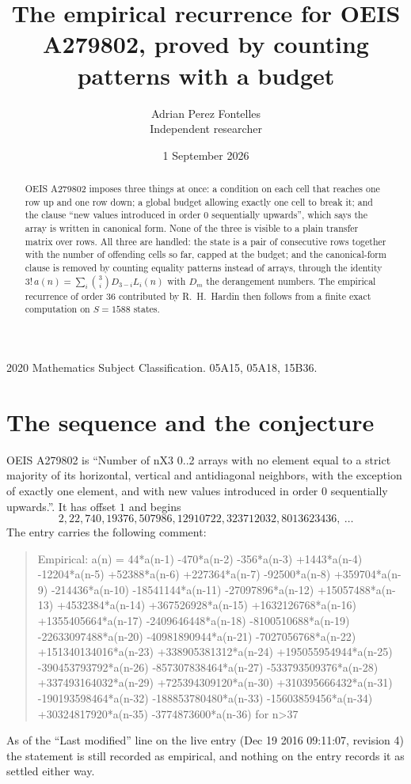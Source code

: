 \documentclass[11pt,a4paper]{article}
\title{The empirical recurrence for OEIS A279802, proved by counting patterns with a budget}
\author{Adrian Perez Fontelles\\ \small Independent researcher}
\date{1 September 2026}
\theoremstyle{plain}
\theoremstyle{definition}
\begin{document}
\maketitle

\begin{abstract}
OEIS A279802 imposes three things at once: a condition on each cell that reaches one row up and
one row down; a global budget allowing exactly one cell to
break it; and the clause ``new values introduced in order $0$ sequentially upwards'', which
says the array is written in canonical form. None of the three is visible to a plain transfer
matrix over rows. All three are handled: the state is a pair of consecutive rows
together with the number of offending cells so far, capped at the budget; and the
canonical-form clause is removed by counting equality patterns instead of arrays, through the
identity $3!\,a(n)=\sum_i\binom{3}{i}D_{3-i}L_i(n)$ with $D_m$ the derangement
numbers. The empirical recurrence of order $36$ contributed by R.~H.~Hardin then follows
from a finite exact computation on $S=1588$ states.
\end{abstract}

\noindent\small 2020 Mathematics Subject Classification. 05A15, 05A18, 15B36.\normalsize

\section{The sequence and the conjecture}

OEIS A279802 is ``Number of nX3 0..2 arrays with no element equal to a strict majority of its horizontal, vertical and antidiagonal neighbors, with the exception of exactly one element, and with new values introduced in order 0 sequentially upwards.''. It has offset $1$ and begins
\[
2, 22, 740, 19376, 507986, 12910722, 323712032, 8013623436,\ \dots
\]
The entry carries the following comment:
\begin{quote}\small
Empirical: a(n) = 44*a(n-1) -470*a(n-2) -356*a(n-3) +1443*a(n-4) -12204*a(n-5) +52388*a(n-6) +227364*a(n-7) -92500*a(n-8) +359704*a(n-9) -214436*a(n-10) -18541144*a(n-11) -27097896*a(n-12) +15057488*a(n-13) +4532384*a(n-14) +367526928*a(n-15) +1632126768*a(n-16) +1355405664*a(n-17) -2409646448*a(n-18) -8100510688*a(n-19) -22633097488*a(n-20) -40981890944*a(n-21) -7027056768*a(n-22) +151340134016*a(n-23) +338905381312*a(n-24) +195055954944*a(n-25) -390453793792*a(n-26) -857307838464*a(n-27) -533793509376*a(n-28) +337493164032*a(n-29) +725394309120*a(n-30) +310395666432*a(n-31) -190193598464*a(n-32) -188853780480*a(n-33) -15603859456*a(n-34) +30324817920*a(n-35) -3774873600*a(n-36) for n>37
\end{quote}
As of the ``Last modified'' line on the live entry (Dec 19 2016 09:11:07, revision 4) the statement is
still recorded as empirical, and nothing on the entry records it as settled either way.
\end{document}
